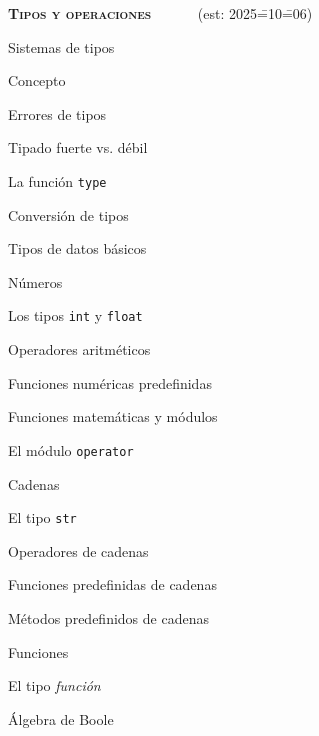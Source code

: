 \begin{longenum}
\begin{longenum}
    \end{longenum}
    \item \textbf{\textsc{Tipos y operaciones}} \ \ \ \ \ \ (est: 2025\==10\==06)
    \begin{longenum}
        \item Sistemas de tipos
        \begin{longenum}
            \item Concepto
            \item Errores de tipos
            \item Tipado fuerte vs. débil
            \item La función \texttt{type}
            \item Conversión de tipos
            \item Tipos de datos básicos
        \end{longenum}
        \item Números
        \begin{longenum}
            \item Los tipos \texttt{int} y \texttt{float}
            \item Operadores aritméticos
            \item Funciones numéricas predefinidas
            \item Funciones matemáticas y módulos
            \begin{longenum}
                \item El módulo \texttt{operator}
            \end{longenum}
        \end{longenum}
        \item Cadenas
        \begin{longenum}
            \item El tipo \texttt{str}
            \item Operadores de cadenas
            \item Funciones predefinidas de cadenas
            \item Métodos predefinidos de cadenas
        \end{longenum}
        \item Funciones
        \begin{longenum}
            \item El tipo \textit{función}
        \end{longenum}
        \item Álgebra de Boole
        \begin{longenum}

\end{longenum}
\end{longenum}
\end{longenum}
